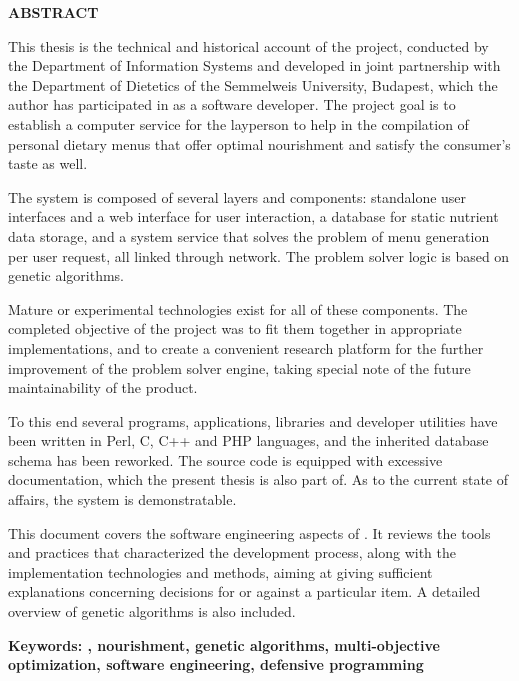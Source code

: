 %
%

\begingroup
\vspace*{1cm}\vspace*{1ex}%
{\centering\large\bfseries\MakeUppercase{Abstract}\par}
\vspace*{12ex}

\itshape\footnotesize

This thesis is the technical and historical account of the \Menugene
project, conducted by the Department of Information Systems and developed
in joint partnership with the Department of Dietetics of the Semmelweis
University, Budapest, which the author has participated in as a software
developer.  The project goal is to establish a computer service for the
layperson to help in the compilation of personal dietary menus that offer
optimal nourishment and satisfy the consumer's taste as well.

The system is composed of several layers and components: standalone
user interfaces and a web interface for user interaction, a database
for static nutrient data storage, and a system service that solves
the problem of menu generation per user request, all linked through
network.  The problem solver logic is based on genetic algorithms.

Mature or experimental technologies exist for all of these components.
The completed objective of the project was to fit them together in
appropriate implementations, and to create a convenient research platform
for the further improvement of the problem solver engine, taking special
note of the future maintainability of the product.

To this end several programs, applications, libraries and developer
utilities have been written in Perl, C, C++ and PHP languages, and
the inherited database schema has been reworked.  The source code
is equipped with excessive documentation, which the present thesis
is also part of.  As to the current state of affairs, the system is
demonstratable.

This document covers the software engineering aspects of \Menugene.
It reviews the tools and practices that characterized the development
process, along with the implementation technologies and methods, aiming
at giving sufficient explanations concerning decisions for or against
a particular item.  A detailed overview of genetic algorithms is also
included.

\bigskip
\upshape\bfseries
\noindent
Keywords: \Menugene, nourishment, genetic algorithms, multi-objective
optimization, software engineering, defensive programming
\endgroup

